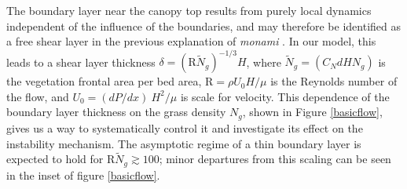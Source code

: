 \documentclass[aps,prl,reprint,twocolumn,showpacs,superscriptaddress,10pt]{revtex4-1}  %
\newcommand{\Rey}{\text{R}}
\newcommand{\Ndg}{\tilde{N}_g}
\newcommand{\monami}{\textit{monami }}
\begin{document}
The boundary layer near the canopy top results from purely local dynamics independent of the influence of the boundaries, and may therefore be identified as a free shear layer\cite{Ghisal02} in the previous explanation of \monami. 
In our model, this leads to a shear layer thickness $\delta = (\Rey\Ndg)^{-1/3} H$, where $\Ndg = \left(C_N d H N_g\right)$ is the vegetation frontal area per bed area, $\Rey=\rho U_0 H/\mu$ is the Reynolds number of the flow, and $U_0 = {(dP/dx)~H^2}/{\mu}$ is scale for velocity. 
This dependence of the boundary layer thickness on the grass density $N_g$, shown in Figure \ref{basicflow}, gives us a way to systematically control it and investigate its effect on the instability mechanism.
The asymptotic regime of a thin boundary layer is expected to hold for $\Rey \Ndg \gtrsim 100$; minor departures from this scaling can be seen in the inset of figure \ref{basicflow}.
\end{document}
